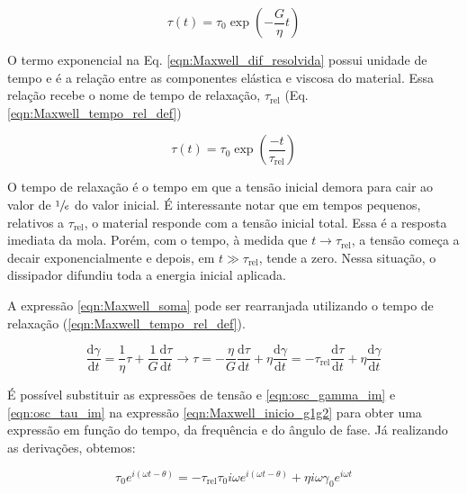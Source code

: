 			\begin{equation}
				\tau(t) = \tau_0 \exp \left( -\dfrac{G}{\eta}t \right)
				\label{eqn:Maxwell_dif_resolvida}
			\end{equation}
			
			O termo exponencial na Eq. \ref{eqn:Maxwell_dif_resolvida} possui unidade de tempo e é a relação entre as componentes elástica e viscosa do material. Essa relação recebe o nome de tempo de relaxação, \(\tau_{\mathrm{rel}}\) (Eq. \ref{eqn:Maxwell_tempo_rel_def})
			
			\begin{equation}
				\tau(t) = \tau_0 \exp \left(\dfrac{-t}{\tau_{\textrm{rel}}}\right)
				\label{eqn:Maxwell_tempo_rel_def}
			\end{equation}
		
			O tempo de relaxação é o tempo em que a tensão inicial demora para cair ao valor de \(\sfrac{1}{e}\) do valor inicial. É interessante notar que em tempos pequenos, relativos a \(\tau_{\mathrm{rel}}\), o material responde com a tensão inicial total. Essa é a resposta imediata da mola. Porém, com o tempo, à medida que \(t\to\tau_{\mathrm{rel}}\), a tensão começa a decair exponencialmente e depois, em \(t \gg \tau_{\mathrm{rel}}\), tende a zero. Nessa situação, o dissipador difundiu toda a energia inicial aplicada.
			
			A expressão \ref{eqn:Maxwell_soma} pode ser rearranjada utilizando o tempo de relaxação (\ref{eqn:Maxwell_tempo_rel_def}).
			
			\begin{equation}
				\dfrac{\mathrm{d}\gamma}{\mathrm{d}t} = \dfrac{1}{\eta}\tau + \dfrac{1}{G}\dfrac{\mathrm{d}\tau}{\mathrm{d}t} \to 
				\tau = -\dfrac{\eta}{G} \dfrac{\mathrm{d}\tau}{\mathrm{d}t} + \eta\dfrac{\mathrm{d}\gamma}{\mathrm{d}t} =
				-\tau_{\textrm{rel}} \dfrac{\mathrm{d}\tau}{\mathrm{d}t} + \eta\dfrac{\mathrm{d}\gamma}{\mathrm{d}t}
				\label{eqn:Maxwell_inicio_g1g2}
			\end{equation}
			
			
			É possível substituir as expressões de tensão e \ref{eqn:osc_gamma_im} e \ref{eqn:osc_tau_im} na expressão \ref{eqn:Maxwell_inicio_g1g2} para obter uma expressão em função do tempo, da frequência e do ângulo de fase. Já realizando as derivações, obtemos:
			
			\begin{equation}
				\tau_0 e^{i \left( \omega t - \theta \right)} = - \tau_{\textrm{rel}} \tau_0 i\omega e^{i \left( \omega t - \theta \right)}     +       \eta i\omega\gamma_0e^{i\omega t}
				\label{eqn:Maxwell_substituicao}
			\end{equation}
			
